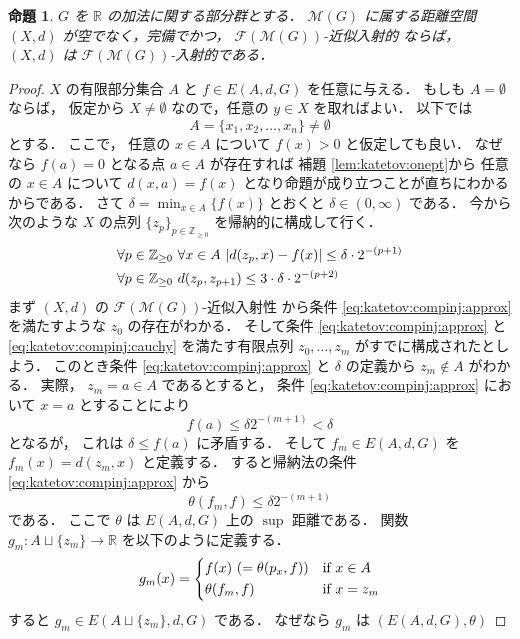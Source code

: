 \documentclass[leqno, 12pt]{jsarticle}
\newtheorem{prop}[thm]{命題}
\newcommand{\zz}{\mathbb{Z}}
\newcommand{\yozz}[1]{\zz_{\ge #1}}
\newcommand{\rr}{\mathbb{R}}
\DeclarePairedDelimiter{\abs}{\lvert}{\rvert}
\newcommand{\Met}[1]{\mathscr{M}(#1)}
\newcommand{\FinitePart}[1]{\mathscr{F}(#1)}
\newcommand{\FinMet}[1]{\FinitePart{\Met{#1}}}
\newcommand{\Espace}[3]{E(#1,#2,#3)}
\newcommand{\KatDist}{\theta}
\newcommand{\kura}[1]{p_{#1}}
\begin{document}
\begin{prop}\label{prop:katetov:compinj}
$G$
を
$\rr$
の加法に関する部分群とする．
$\Met{G}$
に属する距離空間
$(X, d)$
が空でなく，完備でかつ，
$\FinMet{G}$-近似入射的
ならば，
$(X, d)$%
は
$\FinMet{G}$-入射的である．
\end{prop}
\begin{proof}
$X$
の有限部分集合
$A$
と
$f\in \Espace{A}{d}{G}$
を任意に与える．
もしも
$A=\emptyset$
ならば，
仮定から
$X\neq\emptyset$
なので，任意の
$y\in X$
を取ればよい．
以下では
\[
A=\{x_1,x_2,\dots,x_n\}\neq\emptyset
\]
とする．
ここで，%
任意の
$x\in A$
について
$f(x)>0$
と仮定しても良い．
なぜなら
$f(a)=0$
となる点
$a\in A$
が存在すれば
補題
\ref{lem:katetov:onept}から
任意の
$x\in A$
について
$d(x, a)=f(x)$
となり命題が成り立つことが直ちにわかるからである．
さて
$\delta=\min_{x\in A}\{f(x)\}$
とおくと
$\delta\in (0, \infty)$
である．
今から次のような
$X$
の点列
$\{z_p\}_{p\in \yozz{0}}$
を帰納的に構成して行く．
\begin{align}
&\forall p\in \yozz{0}\ \forall x\in A\
\abs{d(z_p,x)-f(x)}\le \delta\cdot 2^{-(p+1)}
\label{eq:katetov:compinj:approx}\\
&\forall p\in \yozz{0}\
d(z_p,z_{p+1})\le 3\cdot \delta\cdot 2^{-(p+2)}
\label{eq:katetov:compinj:cauchy}
\end{align}
まず
$(X, d)$%
の
$\FinMet{G}$-近似入射性
から条件
\eqref{eq:katetov:compinj:approx}
を満たすような
$z_{0}$
の存在がわかる．
そして条件
\eqref{eq:katetov:compinj:approx}
と
\eqref{eq:katetov:compinj:cauchy}
を満たす有限点列
$z_{0},\dots, z_{m}$
がすでに構成されたとしよう．
このとき条件
\eqref{eq:katetov:compinj:approx}
と
$\delta$
の定義から
$z_{m}\not\in A$
がわかる．
実際，
$z_m=a\in A$
であるとすると，
条件
\eqref{eq:katetov:compinj:approx}
において
$x=a$
とすることにより
\[
f(a)\le \delta2^{-(m+1)}<\delta
\]
となるが，
これは
$\delta\le f(a)$
に矛盾する．
そして
$f_{m}\in \Espace{A}{d}{G}$
を%
$f_{m}(x)=d(z_{m}, x)$
と定義する．
すると帰納法の条件
\eqref{eq:katetov:compinj:approx}%
から
\[
\KatDist(f_m, f)\le \delta2^{-(m+1)}
\]
である．%
ここで
$\KatDist$
は
$\Espace{A}{d}{G}$
上の
$\sup$
距離である．
関数
$g_{m}\colon A\sqcup \{z_{m}\}\to \rr$%
を以下のように定義する．
\[
g_{m}(x)=
\begin{dcases}
f(x)\  (=\KatDist(\kura{x}, f)) & \text{if
$x\in A$%
}\\
\KatDist(f_m, f) & \text{if
$x=z_{m}$%
}
\end{dcases}
\]
すると
$g_{m}\in \Espace{A\sqcup\{z_m\}}{d}{G}$
である．
なぜなら
$g_{m}$
は
$(\Espace{A}{d}{G}, \KatDist)$

\end{proof}
\end{document}
